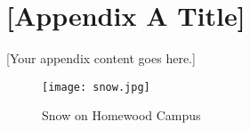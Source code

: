\chapter{[Appendix A Title]}
\label{app:appendixA}

[Your appendix content goes here.]

\begin{figure}[h]
    \centering
    \texttt{[image: snow.jpg]}
    \caption{Snow on Homewood Campus}
    \label{fig:snow}
\end{figure}
